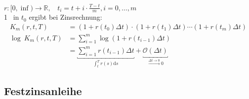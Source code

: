 \begin{enumerate}[(a)]
	\\
	$r:[0,\inf) \to \mathds{R},~~~~t_i= t+i\cdot \frac{T-t}{m}, i=0,\dots,m$\\
	1 \texteuro~in $t_0$ ergibt bei Zinsrechnung:\\
	\begin{equation*}
	\begin{aligned}
		K_m(r,t,T) &= (1+r(t_0)\Delta t)\cdot(1+r(t_1)\Delta t)\cdots(1+r(t_m)\Delta t) \\
		\log~K_m(r,t,T) &= \sum_{i=1}^{m}\log(1+r(t_{i-1})\Delta t) \\
		&= \underbracket{\sum_{i=1}^{m}r(t_{i-1})\Delta t}_{\int_{t}^{T}r(s)\mathrm{d}s} +\underbracket{\mathcal{O}(\Delta t)}_{\stackrel{\Delta t \to 0}{\longrightarrow} 0}
	\end{aligned}
	\end{equation*}
\end{enumerate}

\subsection{Festzinsanleihe}
\label{sub:festzinsanleihe}

